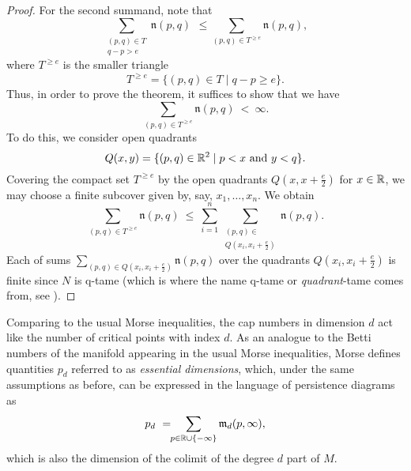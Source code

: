 \begin{proof}
    For the second summand, note that  
    \begin{equation*}
    \sum_{ \substack{ (p,q) \in T \\ q-p > e } } \mathfrak{n} (p,q)
    \ \, \leq \!\!
    \sum_{(p,q) \in T^{\geq e}} \mathfrak{n} (p,q),
    \end{equation*}
    where $T^{\geq e}$ is the smaller triangle 
    \begin{equation*}
    T^{\geq e} = \{(p,q) \in T \mid q-p \geq e\}.
    \end{equation*}
    Thus, in order to prove the theorem, it suffices to show that we have 
    \begin{equation*}
    \sum_{(p,q) \in T^{\geq e}} \mathfrak{n} (p,q) 
    \ < \ 
    \infty.
    \end{equation*}
    To do this, we consider open quadrants 
    \begin{equation*}
    Q(x, y) = \{ (p, q) \in \mathbb{R}^2 \mid p < x \text{ and } y < q \}.
    \end{equation*}
    Covering the compact set $T^{\geq e}$ by the open quadrants $Q \left(x, x + \frac{e}{2} \right)$ for $x \in \mathbb{R}$, we may choose a finite subcover given by, say, $x_1,\dots, x_n$.
	We obtain
    \begin{equation*}
    \sum_{(p,q) \in T^{\geq e}} \mathfrak{n} (p,q) 
    \ \leq \
    \sum_{i=1}^n \sum_{\substack{(p, q) \in \\ Q (x_i, x_i + \frac{e}{2})}} \mathfrak{n}(p,q).
    \end{equation*}
    Each of sums $\sum_{(p,q) \in Q \left(x_i, x_i + \frac{e}{2} \right)} \mathfrak{n}(p,q)$ over the quadrants $Q \left(x_i, x_i + \frac{e}{2} \right)$ is finite since $N$ is q-tame (which is where the name q-tame or \emph{quadrant}-tame comes from, see \cite[Section 3.8]{Chazal.2016a}).
\end{proof}

Comparing to the usual Morse inequalities, the cap numbers in dimension $d$ act like the number of critical points with index $d$.
As an analogue to the Betti numbers of the manifold appearing in the usual Morse inequalities, Morse defines quantities $p_{d}$ referred to as \emph{essential dimensions}, which, under the same assumptions as before, can be expressed in the language of persistence diagrams as
\begin{equation} \label{e:essential dimension}
p_{d} \ = \!\! \sum_{p \in \mathbb{R} \cup \{-\infty\}} \mathfrak{m}_d(p,\infty),
\end{equation}
which is also the dimension of the colimit of the degree $d$ part of $M$.

